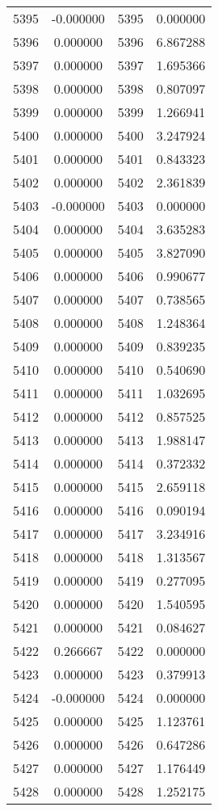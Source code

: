 \documentclass[12pt]{article}
\begin{document}
\begin{longtable}{@{}cccc@{}}
5395 & -0.000000 & 5395 & 0.000000 \\
5396 & 0.000000 & 5396 & 6.867288 \\
5397 & 0.000000 & 5397 & 1.695366 \\
5398 & 0.000000 & 5398 & 0.807097 \\
5399 & 0.000000 & 5399 & 1.266941 \\
5400 & 0.000000 & 5400 & 3.247924 \\
5401 & 0.000000 & 5401 & 0.843323 \\
5402 & 0.000000 & 5402 & 2.361839 \\
5403 & -0.000000 & 5403 & 0.000000 \\
5404 & 0.000000 & 5404 & 3.635283 \\
5405 & 0.000000 & 5405 & 3.827090 \\
5406 & 0.000000 & 5406 & 0.990677 \\
5407 & 0.000000 & 5407 & 0.738565 \\
5408 & 0.000000 & 5408 & 1.248364 \\
5409 & 0.000000 & 5409 & 0.839235 \\
5410 & 0.000000 & 5410 & 0.540690 \\
5411 & 0.000000 & 5411 & 1.032695 \\
5412 & 0.000000 & 5412 & 0.857525 \\
5413 & 0.000000 & 5413 & 1.988147 \\
5414 & 0.000000 & 5414 & 0.372332 \\
5415 & 0.000000 & 5415 & 2.659118 \\
5416 & 0.000000 & 5416 & 0.090194 \\
5417 & 0.000000 & 5417 & 3.234916 \\
5418 & 0.000000 & 5418 & 1.313567 \\
5419 & 0.000000 & 5419 & 0.277095 \\
5420 & 0.000000 & 5420 & 1.540595 \\
5421 & 0.000000 & 5421 & 0.084627 \\
5422 & 0.266667 & 5422 & 0.000000 \\
5423 & 0.000000 & 5423 & 0.379913 \\
5424 & -0.000000 & 5424 & 0.000000 \\
5425 & 0.000000 & 5425 & 1.123761 \\
5426 & 0.000000 & 5426 & 0.647286 \\
5427 & 0.000000 & 5427 & 1.176449 \\
5428 & 0.000000 & 5428 & 1.252175 \\

\end{longtable}
\end{document}
